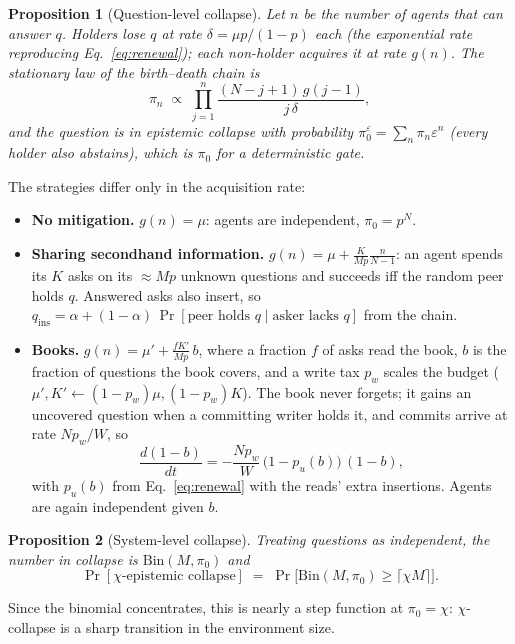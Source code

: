 \documentclass[10pt]{article}
\newtheorem{proposition}{Proposition}
\begin{document}
\begin{proposition}[Question-level collapse]
Let $n$ be the number of agents that can answer $q$. Holders lose $q$ at rate $\delta = \mu p/(1-p)$ each (the exponential rate reproducing Eq.~\ref{eq:renewal}); each non-holder acquires it at rate $g(n)$. The stationary law of the birth--death chain is
\begin{equation}
\pi_n \;\propto\; \prod_{j=1}^{n} \frac{(N-j+1)\,g(j-1)}{j\,\delta},
\end{equation}
and the question is in epistemic collapse with probability $\pi_0^{\varepsilon} = \sum_n \pi_n \varepsilon^n$ (every holder also abstains), which is $\pi_0$ for a deterministic gate.
\end{proposition}
\noindent The strategies differ only in the acquisition rate:
\begin{itemize}
  \item \textbf{No mitigation.} $g(n) = \mu$: agents are independent, $\pi_0 = p^N$.
  \item \textbf{Sharing secondhand information.} $g(n) = \mu + \frac{K}{Mp}\frac{n}{N-1}$: an agent spends its $K$ asks on its $\approx Mp$ unknown questions and succeeds iff the random peer holds $q$. Answered asks also insert, so $q_{\mathrm{ins}} = \alpha + (1-\alpha)\,\Pr[\text{peer holds } q \mid \text{asker lacks } q]$ from the chain.
  \item \textbf{Books.} $g(n) = \mu' + \frac{fK'}{Mp}\,b$, where a fraction $f$ of asks read the book, $b$ is the fraction of questions the book covers, and a write tax $p_w$ scales the budget ($\mu' , K' \leftarrow (1-p_w)\mu, (1-p_w)K$). The book never forgets; it gains an uncovered question when a committing writer holds it, and commits arrive at rate $N p_w/W$, so
  \begin{equation}
  \frac{d(1-b)}{dt} = -\frac{N p_w}{W}\,\big(1 - p_u(b)\big)\,(1-b),
  \end{equation}
  with $p_u(b)$ from Eq.~\ref{eq:renewal} with the reads' extra insertions. Agents are again independent given $b$.
\end{itemize}

\begin{proposition}[System-level collapse]
Treating questions as independent, the number in collapse is $\mathrm{Bin}(M, \pi_0)$ and
\begin{equation}
\Pr[\chi\text{-epistemic collapse}] \;=\; \Pr\big[\mathrm{Bin}(M, \pi_0) \ge \lceil \chi M \rceil\big].
\end{equation}
\end{proposition}
\noindent Since the binomial concentrates, this is nearly a step function at $\pi_0 = \chi$: $\chi$-collapse is a sharp transition in the environment size.
\end{document}
